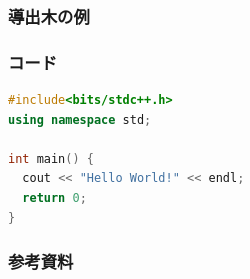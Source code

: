 \documentclass[unicode, 14pt, aspectratio=169]{beamer}
\begin{document}
\begin{frame}
  \frametitle{導出木の例}
  \begin{prooftree}
  \end{prooftree}
\end{frame}

\begin{frame}[fragile]
\frametitle{コード}
  {\small 
    \begin{lstlisting}[language=C++]
#include<bits/stdc++.h>
using namespace std;

int main() {
  cout << "Hello World!" << endl;
  return 0;
}
    \end{lstlisting}
}
\end{frame}

\begin{frame}[allowframebreaks]
  \frametitle{参考資料}
  \printbibliography
  \nocite{*} 
\end{frame}
\end{document}
